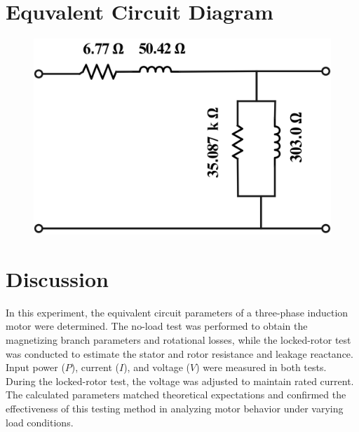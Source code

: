 \documentclass[a4paper,12pt]{article}
\begin{document}
\section{Equvalent Circuit Diagram}

\begin{figure}[H]
	\centering
	\includegraphics[width=0.6\linewidth]{Images/3}
	\caption{}
	\label{fig:3}
\end{figure}


	
\section{Discussion}

In this experiment, the equivalent circuit parameters of a three-phase induction motor were determined. The no-load test was performed to obtain the magnetizing branch parameters and rotational losses, while the locked-rotor test was conducted to estimate the stator and rotor resistance and leakage reactance. Input power ($P$), current ($I$), and voltage ($V$) were measured in both tests. During the locked-rotor test, the voltage was adjusted to maintain rated current. The calculated parameters matched theoretical expectations and confirmed the effectiveness of this testing method in analyzing motor behavior under varying load conditions.

	
	
	
\end{document}

